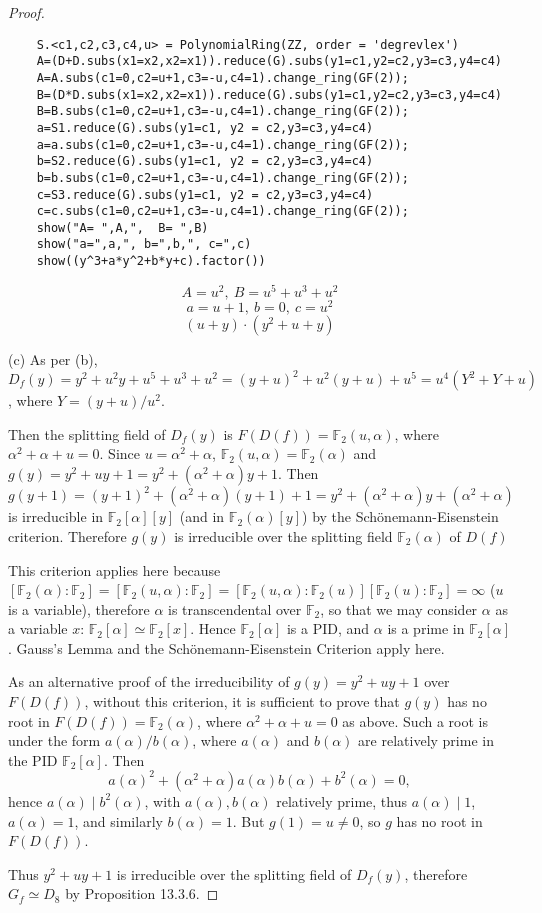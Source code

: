 \documentclass[11pt,a4paper]{article}
\newcommand{\F}{\mathbb{F}}
\begin{document}
{\begin{proof}
\begin{verbatim}
    S.<c1,c2,c3,c4,u> = PolynomialRing(ZZ, order = 'degrevlex')
    A=(D+D.subs(x1=x2,x2=x1)).reduce(G).subs(y1=c1,y2=c2,y3=c3,y4=c4)
    A=A.subs(c1=0,c2=u+1,c3=-u,c4=1).change_ring(GF(2));
    B=(D*D.subs(x1=x2,x2=x1)).reduce(G).subs(y1=c1,y2=c2,y3=c3,y4=c4)
    B=B.subs(c1=0,c2=u+1,c3=-u,c4=1).change_ring(GF(2));
    a=S1.reduce(G).subs(y1=c1, y2 = c2,y3=c3,y4=c4)
    a=a.subs(c1=0,c2=u+1,c3=-u,c4=1).change_ring(GF(2));
    b=S2.reduce(G).subs(y1=c1, y2 = c2,y3=c3,y4=c4)
    b=b.subs(c1=0,c2=u+1,c3=-u,c4=1).change_ring(GF(2));
    c=S3.reduce(G).subs(y1=c1, y2 = c2,y3=c3,y4=c4)
    c=c.subs(c1=0,c2=u+1,c3=-u,c4=1).change_ring(GF(2));
    show("A= ",A,",  B= ",B)
    show("a=",a,", b=",b,", c=",c)
    show((y^3+a*y^2+b*y+c).factor())
\end{verbatim}
$$A= u^{2},~ B=u^{5} + u^{3} + u^{2}$$
$$a= u + 1,~b= 0,~ c= u^{2}$$
$$(u + y) \cdot (y^{2} + u + y)$$
\item[(c)] As per (b), $D_f(y)=y^2+u^2y+u^5+u^3+u^2=(y+u)^2+u^2(y+u)+u^5=u^4(Y^2+Y+u)$, where $Y=({y+u})/{u^2}$.

Then the splitting field of $D_f(y)$ is $F(D(f))=\mathbb{F}_2(u,\alpha)$, where $\alpha^2+\alpha+u=0$. Since $u=\alpha^2+\alpha$, $\mathbb{F}_2(u,\alpha)=\mathbb{F}_2(\alpha)$ and $g(y)=y^2+uy+1=y^2+(\alpha^2+\alpha)y+1$. Then $g(y+1)=(y+1)^2+(\alpha^2+\alpha)(y+1)+1=y^2+(\alpha^2+\alpha)y+(\alpha^2+\alpha)$ is irreducible in $\mathbb{F}_2[\alpha][y]$  (and in $\F_2(\alpha)[y]$) by the Sch\"onemann-Eisenstein criterion. Therefore $g(y)$ is irreducible over the splitting field $\F_2(\alpha)$ of $D(f)$

This criterion applies here because $[\F_2(\alpha) : \F_2] = [\F_2(u, \alpha) : \F_2] = [\F_2(u,\alpha) : \F_2(u)][\F_2(u):\F_2] = \infty$ ($u$ is a variable), therefore $\alpha$ is transcendental over $\F_2$, so that we may consider $\alpha$ as a variable $x$: $\F_2[\alpha] \simeq \F_2[x]$. Hence $\F_2[\alpha]$ is a PID, and $\alpha$ is a prime in $\F_2[\alpha]$. Gauss's Lemma and the Sch\"onemann-Eisenstein Criterion apply here.

As an alternative proof of the irreducibility of $g(y) = y^2 + uy + 1$ over $F(D(f))$, without this criterion, it is sufficient to prove that $g(y)$ has no root in $F(D(f)) = \F_2(\alpha)$, where $\alpha^2 + \alpha + u = 0$ as above. Such a root is under the form $a(\alpha)/b(\alpha)$, where $a(\alpha)$ and $b(\alpha)$ are relatively prime in the PID $\F_2[\alpha]$. Then
$$a(\alpha) ^2 +  (\alpha^2 + \alpha) a(\alpha) b(\alpha) + b^2(\alpha) = 0,$$
hence $a(\alpha) \mid  b^2(\alpha)$, with $a(\alpha), b(\alpha)$ relatively prime, thus $a(\alpha) \mid 1$, $a(\alpha) = 1$, and similarly $b(\alpha) = 1$. But $g(1) = u \ne 0$, so $g$ has no root in $F(D(f))$.

Thus $y^2+uy+1$ is irreducible over the splitting field of $D_f(y)$, therefore $G_f \simeq D_8$ by Proposition 13.3.6.
\end{proof}
}
\end{document}
